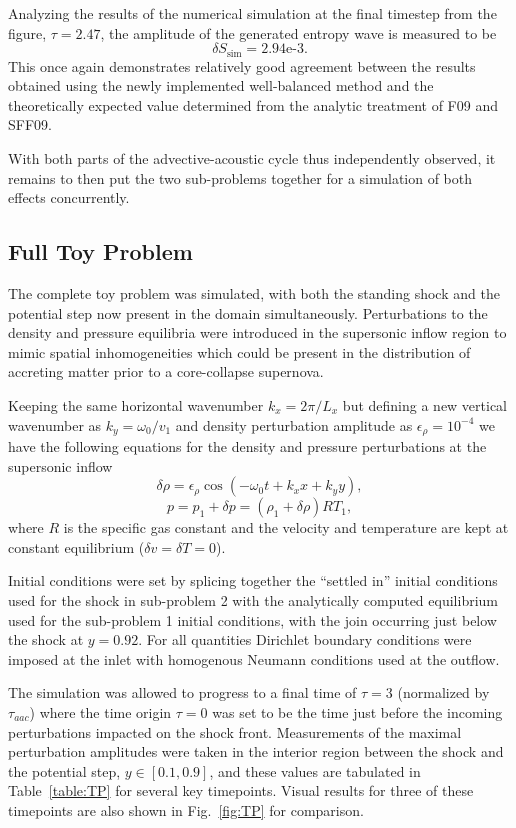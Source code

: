 Analyzing the results of the numerical simulation at the final timestep from the figure, $\tau=2.47$, the amplitude of the generated entropy wave is measured to be $$\delta S_\textrm{sim}=2.94\textrm{e-}3.$$ This once again demonstrates relatively good agreement between the results obtained using the newly implemented well-balanced method and the theoretically expected value determined from the analytic treatment of F09 and SFF09.

With both parts of the advective-acoustic cycle thus independently observed, it remains to then put the two sub-problems together for a simulation of both effects concurrently.

\subsection{Full Toy Problem}
\label{subsec:results_TP}

The complete toy problem was simulated, with both the standing shock and the potential step now present in the domain simultaneously. Perturbations to the density and pressure equilibria were introduced in the supersonic inflow region to mimic spatial inhomogeneities which could be present in the distribution of accreting matter prior to a core-collapse supernova.

Keeping the same horizontal wavenumber $k_x=2\pi/L_x$ but defining a new vertical wavenumber as $k_y=\omega_0/v_1$ and density perturbation amplitude as $\epsilon_\rho=10^{-4}$ we have the following equations for the density and pressure perturbations at the supersonic inflow
\begin{equation}
\delta\rho=\epsilon_\rho\cos\left(-\omega_0t+k_xx+k_yy\right),
\end{equation}
\begin{equation}
p=p_1+\delta p=(\rho_1+\delta\rho)RT_1,
\end{equation}
where $R$ is the specific gas constant and the velocity and temperature are kept at constant equilibrium ($\delta v=\delta T=0$).

Initial conditions were set by splicing together the ``settled in'' initial conditions used for the shock in sub-problem 2 with the analytically computed equilibrium used for the sub-problem 1 initial conditions, with the join occurring just below the shock at $y=0.92$. For all quantities Dirichlet boundary conditions were imposed at the inlet with homogenous Neumann conditions used at the outflow.

The simulation was allowed to progress to a final time of $\tau=3$ (normalized by $\tau_{aac}$) where the time origin $\tau=0$ was set to be the time just before the incoming perturbations impacted on the shock front. Measurements of the maximal perturbation amplitudes were taken in the interior region between the shock and the potential step, $y\in[0.1,0.9]$, and these values are tabulated in Table~\ref{table:TP} for several key timepoints. Visual results for three of these timepoints are also shown in Fig.~\ref{fig:TP} for comparison.

